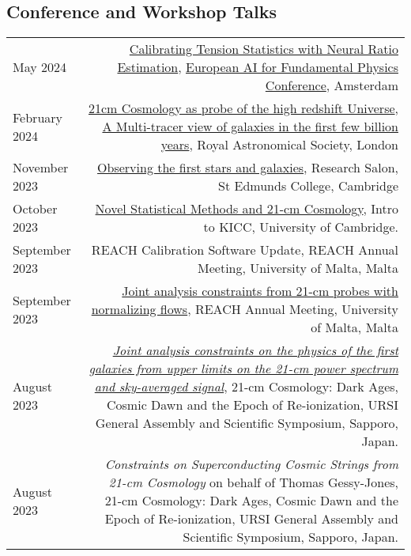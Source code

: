 \documentclass{article}
\begin{document}
\subsection*{Conference and Workshop Talks}
\begin{tabular}{L!{\vrule}R}
    May 2024 & \href{https://github.com/htjb/Talks/raw/master/Talks/Amsterdam-EuCAIF-2024/tensions.pdf}{Calibrating Tension Statistics with Neural Ratio Estimation}, \href{https://indico.nikhef.nl/event/4875/}{European AI for Fundamental Physics Conference}, Amsterdam \\
    February 2024 & \href{https://github.com/htjb/Talks/raw/master/Talks/RAS_Multi-tracer_View/21cmCosmo.pdf}{21cm Cosmology as probe of the high redshift Universe}, \href{https://ras.ac.uk/events-and-meetings/ras-meetings/multi-tracer-view-galaxies-first-few-billion-years}{A Multi-tracer view of galaxies in the first few billion years}, Royal Astronomical Society, London \\
    November 2023 & \href{https://github.com/htjb/Talks/raw/master/Talks/St_Edmunds_Research_Salon_Nov_2023/research_salon.pdf}{Observing the first stars and galaxies}, Research Salon, St Edmunds College, Cambridge \\
    October 2023 & \href{https://github.com/htjb/Talks/raw/master/Talks/KICC_Intro_23/kicc_intro_23.pdf}{Novel Statistical Methods and 21-cm Cosmology}, Intro to KICC, University of Cambridge. \\
    September 2023 & REACH Calibration Software Update, REACH Annual Meeting, University of Malta, Malta \\
    September 2023 & \href{https://github.com/htjb/Talks/tree/master/Talks/REACH_Malta/joint_analysis_margarine.pdf}{Joint analysis constraints from 21-cm probes with normalizing flows}, REACH Annual Meeting, University of Malta, Malta \\
    August 2023 & \href{https://github.com/htjb/Talks/raw/master/Talks/URSI_2023/joint_analysis_margarine.pdf}{\textit{Joint analysis constraints on the physics of the first galaxies from upper limits on the 21-cm power spectrum and sky-averaged signal}}, 21-cm Cosmology: Dark Ages, Cosmic Dawn and the Epoch of Re-ionization, URSI General Assembly and Scientific Symposium, Sapporo, Japan. \\
    August 2023 & \textit{Constraints on Superconducting Cosmic Strings from 21-cm Cosmology} on behalf of Thomas Gessy-Jones, 21-cm Cosmology: Dark Ages, Cosmic Dawn and the Epoch of Re-ionization, URSI General Assembly and Scientific Symposium, Sapporo, Japan. \\

\end{tabular}
\end{document}
